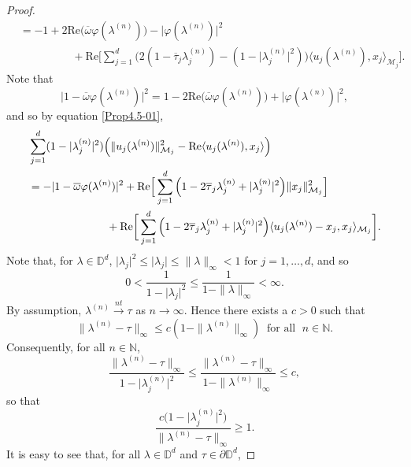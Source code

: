 \documentclass[11pt, reqno]{amsart}
\newcommand\1{\boldsymbol {1}}
\numberwithin{equation}{section}
\begin{document}
\begin{proof}
\begin{align}
&=-1+2\mathrm{Re}\big(\overline{\omega}\varphi(\lambda^{(n)})\big)-\lvert \varphi(\lambda^{(n)}) \rvert^{2}\nonumber \\
&\hspace{2cm}+ \mathrm{Re}\bigg[\sum_{j=1}^{d}\Big(2(1-\overline{\tau}_{j}\lambda^{(n)}_{j})-(1-\lvert \lambda^{(n)}_{j}\rvert^{2})\Big)\langle u_{j}(\lambda^{(n)}),x_{j}\rangle_{\mathcal{M}_{j}}\bigg]. \label{Prop4.5-01}
\end{align} 
Note that
$$\lvert1-\overline{\omega}\varphi(\lambda^{(n)})\rvert^{2}= 1-2\mathrm{Re}\big(\overline{\omega}\varphi(\lambda^{(n)})\big)+\lvert \varphi(\lambda^{(n)}) \rvert^{2}, $$
and so by equation \eqref{Prop4.5-01},
\begin{align}
&\sum_{j=1}^{d}(1-\lvert \lambda^{(n)}_{j} \rvert^{2})\Big(\|u_{j}(\lambda^{(n)})\|_{\mathcal{M}_{j}}^{2}-
\mathrm{Re} \langle u_{j}(\lambda^{(n)}),x_{j}\rangle \Big)\nonumber\\
&=-\lvert1-\overline{\omega}\varphi(\lambda^{(n)})\rvert^{2}+\mathrm{Re}\Big[\sum_{j=1}^{d}\Big(1-2\overline{\tau}_{j}\lambda^{(n)}_{j}+\lvert\lambda^{(n)}_{j}\rvert^{2}\Big)\|x_{j}\|_{\mathcal{M}_{j}}^{2}\Big]\nonumber\\
&\hspace{2.5cm}+\mathrm{Re}\bigg[\sum_{j=1}^{d}\Big(1-2\overline{\tau}_{j}\lambda^{(n)}_{j}+\lvert\lambda^{(n)}_{j}\rvert^{2}\Big)\langle u_{j}(\lambda^{(n)})-x_{j},x_{j}\rangle_{\mathcal{M}_{j}}\bigg].\label{lastequationhereinthispart}
\end{align} 
Note that, for $\lambda\in\mathbb{D}^{d}$, $\lvert \lambda_{j}\rvert^{2}\leq \lvert \lambda_{j} \rvert \leq \|\lambda\|_{\infty} <1$ for $j=1,\hdots, d$, and so
$$ 0< \dfrac{1}{1-\lvert \lambda_{j}\rvert^{2}} \leq \dfrac{1}{1-\|\lambda\|_{\infty}} < \infty.$$
By assumption, $\lambda^{(n)}{\overset{nt}\rightarrow}\tau$ as $n\rightarrow \infty$. Hence there exists a $c>0$ such that
$$\|\lambda^{(n)} - \tau\|_{\infty}\leq c(1-\|\lambda^{(n)}\|_{\infty}) \;\; \text{for all } \; n \in \mathbb{N}.$$
Consequently, for all $ n \in \mathbb{N}$,
$$\dfrac{\|\lambda^{(n)}-\tau\|_{\infty}}{1-\lvert \lambda^{(n)}_{j} \rvert^{2}}\leq \dfrac{\|\lambda^{(n)}-\tau\|_{\infty}}{1-\|\lambda^{(n)}\|_{\infty}}\leq c,$$
so that
\begin{equation}\label{inequalitywithc}
\dfrac{c \big(1-\lvert \lambda^{(n)}_{j}\rvert^{2}\big)}{\|\lambda^{(n)}-\tau\|_{\infty}}\geq 1.
\end{equation}
It is easy to see that, for all $\lambda\in\mathbb{D}^{d}$ and $\tau \in\partial\mathbb{D}^{d}$,

\end{proof}
\end{document}
